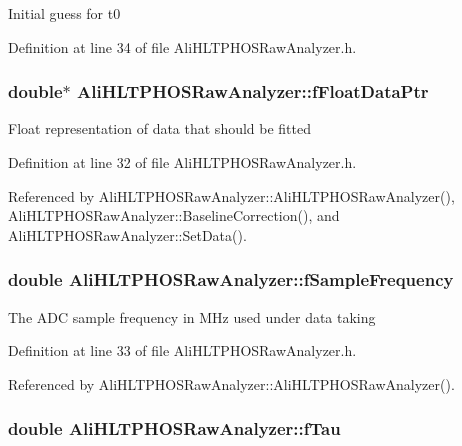 Initial guess for t0 

Definition at line 34 of file Ali\-HLTPHOSRaw\-Analyzer.h.
\subsubsection{\setlength{\rightskip}{0pt plus 5cm}double$\ast$ {\bf Ali\-HLTPHOSRaw\-Analyzer::f\-Float\-Data\-Ptr}\hspace{0.3cm}{\tt  [protected, inherited]}}\label{classAliHLTPHOSRawAnalyzer_AliHLTPHOSRawAnalyzerPeakFinderp0}


Float representation of data that should be fitted 

Definition at line 32 of file Ali\-HLTPHOSRaw\-Analyzer.h.

Referenced by Ali\-HLTPHOSRaw\-Analyzer::Ali\-HLTPHOSRaw\-Analyzer(), Ali\-HLTPHOSRaw\-Analyzer::Baseline\-Correction(), and Ali\-HLTPHOSRaw\-Analyzer::Set\-Data().
\subsubsection{\setlength{\rightskip}{0pt plus 5cm}double {\bf Ali\-HLTPHOSRaw\-Analyzer::f\-Sample\-Frequency}\hspace{0.3cm}{\tt  [protected, inherited]}}\label{classAliHLTPHOSRawAnalyzer_AliHLTPHOSRawAnalyzerPeakFinderp1}


The ADC sample frequency in MHz used under data taking 

Definition at line 33 of file Ali\-HLTPHOSRaw\-Analyzer.h.

Referenced by Ali\-HLTPHOSRaw\-Analyzer::Ali\-HLTPHOSRaw\-Analyzer().
\subsubsection{\setlength{\rightskip}{0pt plus 5cm}double {\bf Ali\-HLTPHOSRaw\-Analyzer::f\-Tau}\hspace{0.3cm}{\tt  [protected, inherited]}}\label{classAliHLTPHOSRawAnalyzer_AliHLTPHOSRawAnalyzerPeakFinderp4}


